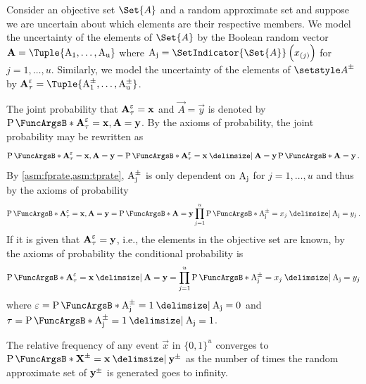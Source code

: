 \documentclass[10pt,final,hidelinks]{article}
\numberwithin{equation}{section}
\begin{document}

Consider an objective set $\Set{A}$ and a random approximate set  and suppose we are uncertain about which elements are their respective members.
We model the uncertainty of the elements of $\Set{A}$ by the Boolean random vector $\vec{A} = \Tuple{\RV{A_1},\ldots,\RV{A_u}}$ where $\RV{A_j} = \SetIndicator{\Set{A}}\left(x_{(j)}\right)$ for $j=1,\ldots,u$.
Similarly, we model the uncertainty of the elements of $\ASet{A}$ by $\AVec{A}[\tprate][\fprate] = \Tuple{\AVecComp{A}[1],\ldots,\AVecComp{A}[u]}$.

The joint probability that $\AVec{A}[\tprate][\fprate] = \vec{x}$ and $\vec{A} = \vec{y}$ is denoted by $\Prob{\AVec{A}[\tprate][\fprate] = \vec{x},\vec{A} = \vec{y}}$.
By the axioms of probability, the joint probability may be rewritten as
\begin{equation}
    \Prob{\AVec{A}[\tprate][\fprate] = \vec{x},\vec{A} = \vec{y}} =
        \Prob{\AVec{A}[\tprate][\fprate] = \vec{x} \Given \vec{A} = \vec{y}}
        \Prob{\vec{A} = \vec{y}}\,.
\end{equation}
By \cref{asm:fprate,asm:tprate}, $\AVecComp{A}[j]$ is only dependent on 
$\mathrm{A_j}$ for $j=1,\ldots,u$ and thus by the axioms of probability
\begin{equation}
    \Prob{\AVec{A}[\tprate][\fprate] = \vec{x},\vec{A} = \vec{y}} = 
    \Prob{\vec{A} = \vec{y}} 
        \prod_{j=1}^{u} \Prob{\AVecComp{A}[j] = x_j \Given \RV{A_j} = y_j}\,.
\end{equation}
If it is given that $\AVec{A}[\tprate][\fprate] = \vec{y}$, i.e., the elements in the 
objective set are known, by the axioms of probability the conditional 
probability is
\begin{equation}
    \Prob{\AVec{A}[\tprate][\fprate] = \vec{x} \Given \vec{A} = \vec{y}} = \prod_{j=1}^{u} 
    \Prob{\AVecComp{A}[j] = x_j \Given \RV{A_j} = y_j}
\end{equation}
where $\fprate = \Prob{\AVecComp{A}[j]=1 \Given \RV{A_j}=0}$ and $\tprate = \Prob{\AVecComp{A}[j]=1 \Given \RV{A_j}=1}$.




The relative frequency of any event $\vec{x}$ in $\{0,1\}^u$ converges to $\Prob{\AVec{X} = \vec{x} \Given \AVec{y}}$ as the number of times the random approximate set of $\AVec{y}$ is generated goes to infinity.
\end{document}
